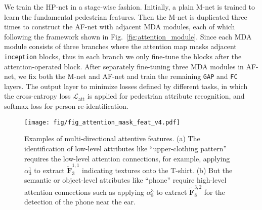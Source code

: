 \documentclass[10pt,twocolumn,letterpaper]{article}
\begin{document}
We train the HP-net in a stage-wise fashion.
%
Initially, a plain M-net is trained to learn the fundamental pedestrian features.
%
Then the M-net is duplicated three times to construct the AF-net with adjacent MDA modules, each of which following the framework shown in Fig.~\ref{fig:attention_module}.
%
%
Since each MDA module consists of three branches where the attention map masks adjacent \texttt{inception} blocks, thus in each branch we only fine-tune the blocks after the attention-operated block.
%
After separately fine-tuning three MDA modules in AF-net, we fix both the M-net and AF-net and train the remaining \texttt{GAP} and \texttt{FC} layers.
%
The output layer to minimize losses defined by different tasks, in which the cross-entropy loss $\mathcal{L}_\text{att}$ is applied for pedestrian attribute recognition, and softmax loss for person re-identification.






\begin{figure}[t]
\centering
\texttt{[image: fig/fig\_attention\_mask\_feat\_v4.pdf]}
\caption{
Examples of multi-directional attentive features.
%
(a) The identification of low-level attributes like ``upper-clothing pattern'' requires the low-level attention connections, for example, applying $\alpha^1_3$ to extract $\tilde{\mathbf{F}}^{1,1}_3$ indicating textures onto the T-shirt. (b) But the semantic or object-level attributes like ``phone'' require high-level attention connections such as applying $\alpha^3_8$ to extract $\tilde{\mathbf{F}}^{3,2}_8$ for the detection of the phone near the ear.
}
\label{fig:attention_mask_feat}
\end{figure}
\end{document}
